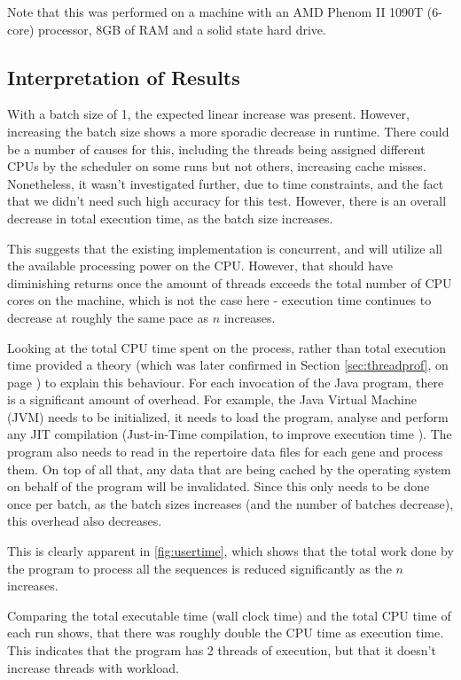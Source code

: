 Note that this was performed on a machine with an AMD Phenom II 1090T (6-core) processor, 8GB of RAM and a solid state hard drive.

\subsection{Interpretation of Results}
\label{sec:threadbench}
With a batch size of 1, the expected linear increase was present. However, increasing the batch size shows a more sporadic decrease in runtime. There could be a number of causes for this, including the threads being assigned different CPUs by the scheduler on some runs but not others, increasing cache misses. Nonetheless, it wasn't investigated further, due to time constraints, and the fact that we didn't need such high accuracy for this test. However, there is an overall decrease in total execution time, as the batch size increases.

This suggests that the existing implementation is concurrent, and will utilize all the available processing power on the CPU. However, that should have diminishing returns once the amount of threads exceeds the total number of CPU cores on the machine, which is not the case here - execution time continues to decrease at roughly the same pace as $n$ increases.

Looking at the total CPU time spent on the process, rather than total execution time provided a theory (which was later confirmed in Section \ref{sec:threadprof}, on page \pageref{sec:threadprof}) to explain this behaviour.
For each invocation of the Java program, there is a significant amount of overhead. For example, the Java Virtual Machine (JVM) needs to be initialized, it needs to load the program, analyse and perform any JIT compilation (Just-in-Time compilation, to improve execution time \autocite{jit}). The program also needs to read in the repertoire data files for each gene and process them. On top of all that, any data that are being cached by the operating system on behalf of the program will be invalidated. Since this only needs to be done once per batch, as the batch sizes increases (and the number of batches decrease), this overhead also decreases.

This is clearly apparent in \autoref{fig:usertime}, which shows that the total work done by the program to process all the sequences is reduced significantly as the $n$ increases.

Comparing the total executable time (wall clock time) and the total CPU time of each run shows, that there was roughly double the CPU time as execution time. This indicates that the program has 2 threads of execution, but that it doesn't increase threads with workload.


